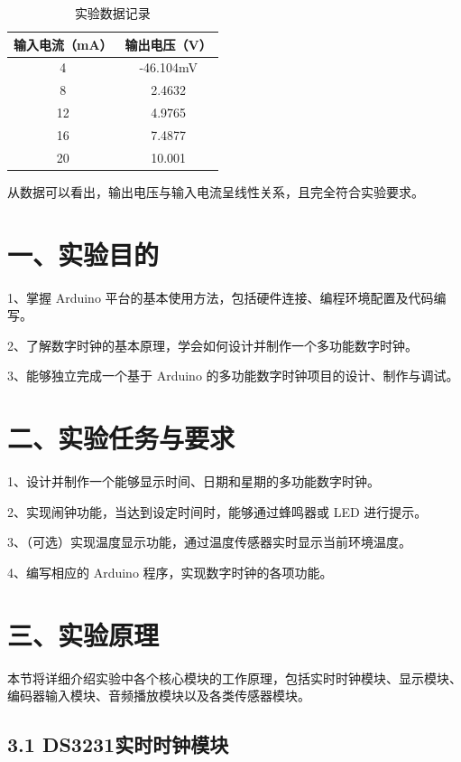 \documentclass[12pt,a4paper]{article}
\begin{document}
\begin{table}[H]
\centering
\begin{tabular}{|c|c|}
    \hline
    输入电流（mA） & 输出电压（V） \\
    \hline
    4 & -46.104mV \\
    \hline
    8 & 2.4632 \\
    \hline
    12 & 4.9765 \\
    \hline
    16 & 7.4877 \\

    \hline
    20 & 10.001 \\
    \hline

    
\end{tabular}
\caption{实验数据记录}
\end{table}
从数据可以看出，输出电压与输入电流呈线性关系，且完全符合实验要求。

\section*{一、实验目的}

1、掌握 Arduino 平台的基本使用方法，包括硬件连接、编程环境配置及代码编写。

2、了解数字时钟的基本原理，学会如何设计并制作一个多功能数字时钟。

3、能够独立完成一个基于 Arduino 的多功能数字时钟项目的设计、制作与调试。


\section*{二、实验任务与要求}


1、设计并制作一个能够显示时间、日期和星期的多功能数字时钟。

2、实现闹钟功能，当达到设定时间时，能够通过蜂鸣器或 LED 进行提示。

3、（可选）实现温度显示功能，通过温度传感器实时显示当前环境温度。

4、编写相应的 Arduino 程序，实现数字时钟的各项功能。

\section*{三、实验原理}

本节将详细介绍实验中各个核心模块的工作原理，包括实时时钟模块、显示模块、编码器输入模块、音频播放模块以及各类传感器模块。

\subsection*{3.1 DS3231实时时钟模块}
\end{document}
